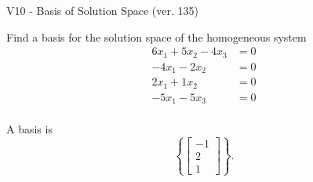 \begin{exercise}
  \begin{exerciseTitle}V10 - Basis of Solution Space (ver. 135)\end{exerciseTitle}
  \begin{exerciseStatement}
    Find a basis for the solution space of the homogeneous system 
\begin{align*}
 6 x_ 1 + 5 x_ 2 -4 x_ 3 &= 0  \\ 
  -4 x_ 1 -2 x_ 2 &= 0  \\ 
  2 x_ 1 + 1 x_ 2 &= 0  \\ 
  -5 x_ 1 -5 x_ 3 &= 0  \\ 
 \end{align*}


 
  \end{exerciseStatement}

  \begin{exerciseAnswer}
   A basis is   
\[\left\{\left[\begin{array}{c}
-1 \\
2 \\
1
\end{array}\right]\right\}.\]

  


  \end{exerciseAnswer}
\end{exercise}